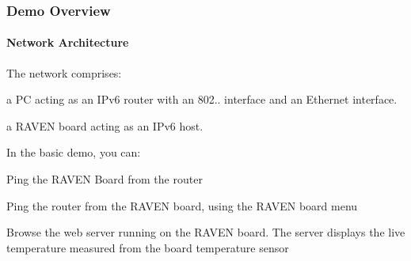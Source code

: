  \hypertarget{a00072_overview}{}\subsubsection{Demo Overview}\label{a00072_overview}
\hypertarget{a00072_overview_architecture}{}\paragraph{Network Architecture}\label{a00072_overview_architecture}
The network comprises\+: \begin{DoxyItemize}
\item a PC acting as an I\+Pv6 router with an 802.. interface and an Ethernet interface. \item a R\+A\+V\+EN board acting as an I\+Pv6 host.\end{DoxyItemize}
In the basic demo, you can\+: \begin{DoxyItemize}
\item Ping the R\+A\+V\+EN Board from the router \item Ping the router from the R\+A\+V\+EN board, using the R\+A\+V\+EN board menu \item Browse the web server running on the R\+A\+V\+EN board. The server displays the live temperature measured from the board temperature sensor\end{DoxyItemize}
 

